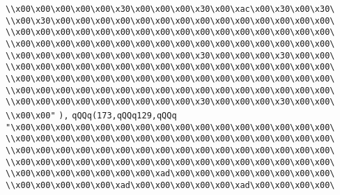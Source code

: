 \verb|\\x00\x00\x00\x00\x00\x30\x00\x00\x00\x30\x00\xac\x00\x30\x00\x30\|\newline
\verb|\\x00\x30\x00\x00\x00\x00\x00\x00\x00\x00\x00\x00\x00\x00\x00\x00\|\newline
\verb|\\x00\x00\x00\x00\x00\x00\x00\x00\x00\x00\x00\x00\x00\x00\x00\x00\|\newline
\verb|\\x00\x00\x00\x00\x00\x00\x00\x00\x00\x00\x00\x00\x00\x00\x00\x00\|\newline
\verb|\\x00\x00\x00\x00\x00\x00\x00\x00\x00\x30\x00\x00\x00\x30\x00\x00\|\newline
\verb|\\x00\x00\x00\x00\x00\x00\x00\x00\x00\x00\x00\x00\x00\x00\x00\x00\|\newline
\verb|\\x00\x00\x00\x00\x00\x00\x00\x00\x00\x00\x00\x00\x00\x00\x00\x00\|\newline
\verb|\\x00\x00\x00\x00\x00\x00\x00\x00\x00\x00\x00\x00\x00\x00\x00\x00\|\newline
\verb|\\x00\x00\x00\x00\x00\x00\x00\x00\x00\x30\x00\x00\x00\x30\x00\x00\|\newline
\verb|\\x00\x00"|\newline
\verb|),|\newline
\verb|qQQq(173,qQQq129,qQQq|\newline
\verb|"\x00\x00\x00\x00\x00\x00\x00\x00\x00\x00\x00\x00\x00\x00\x00\x00\|\newline
\verb|\\x00\x00\x00\x00\x00\x00\x00\x00\x00\x00\x00\x00\x00\x00\x00\x00\|\newline
\verb|\\x00\x00\x00\x00\x00\x00\x00\x00\x00\x00\x00\x00\x00\x00\x00\x00\|\newline
\verb|\\x00\x00\x00\x00\x00\x00\x00\x00\x00\x00\x00\x00\x00\x00\x00\x00\|\newline
\verb|\\x00\x00\x00\x00\x00\x00\x00\xad\x00\x00\x00\x00\x00\x00\x00\x00\|\newline
\verb|\\x00\x00\x00\x00\x00\xad\x00\x00\x00\x00\x00\xad\x00\x00\x00\x00\|\newline

